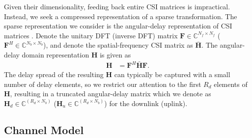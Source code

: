 Given their dimensionality, feeding back entire CSI matrices is impractical. Instead, we seek a compressed representation of a sparse transformation. The sparse representation we consider is the angular-delay representation of CSI matrices \cite{ref:sayeed2002deconstructing}. Denote the unitary DFT (inverse DFT) matrix $\mathbf F \in \mathbb C^{N_f \times N_f}$ ($\mathbf F^H \in \mathbb C^{N_b \times N_b}$), and denote the spatial-frequency CSI matrix as $\bar{\mathbf H}$. The angular-delay domain representation $\mathbf H$ is given as %
\begin{align*}
	\mathbf H &= \mathbf F^H \bar{\mathbf H} \mathbf F.
\end{align*}
The delay spread of the resulting $\mathbf H$ can typically be captured with a small number of delay elements, so we restrict our attention to the first $R_d$ elements of $\mathbf H$, resulting in a truncated angular-delay matrix which we denote as $\mathbf H_d \in \mathbb C^{(R_d\times N_b)}$ ($\mathbf H_u \in \mathbb C^{(R_d\times N_b)}$) for the downlink (uplink).

\subsection{Channel Model}
\label{sect:channel_model}

